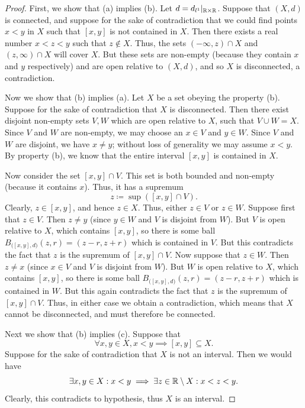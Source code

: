 \begin{proof}
  First, we show that (a) implies (b).
  Let \(d = d_{l^1}|_{\mathbb{R} \times \mathbb{R}}\).
  Suppose that \((X, d)\) is connected, and suppose for the sake of contradiction that we could find points \(x < y\) in \(X\) such that \([x, y]\) is not contained in \(X\).
  Then there exists a real number \(x < z < y\) such that \(z \notin X\).
  Thus, the sets \((-\infty, z) \cap X\) and \((z, \infty) \cap X\) will cover \(X\).
  But these sets are non-empty (because they contain \(x\) and \(y\) respectively) and are open relative to \((X, d)\), and so \(X\) is disconnected, a contradiction.

  Now we show that (b) implies (a).
  Let \(X\) be a set obeying the property (b).
  Suppose for the sake of contradiction that \(X\) is disconnected.
  Then there exist disjoint non-empty sets \(V , W\) which are open relative to \(X\), such that \(V \cup W = X\).
  Since \(V\) and \(W\) are non-empty, we may choose an \(x \in V\) and \(y \in W\).
  Since \(V\) and \(W\) are disjoint, we have \(x \neq y\);
  without loss of generality we may assume \(x < y\).
  By property (b), we know that the entire interval \([x, y]\) is contained in \(X\).

  Now consider the set \([x, y] \cap V\).
  This set is both bounded and non-empty (because it contains \(x\)).
  Thus, it has a supremum
  \[
    z \coloneqq \sup([x, y] \cap V).
  \]
  Clearly, \(z \in [x, y]\), and hence \(z \in X\).
  Thus, either \(z \in V\) or \(z \in W\).
  Suppose first that \(z \in V\).
  Then \(z \neq y\) (since \(y \in W\) and \(V\) is disjoint from \(W\)).
  But \(V\) is open relative to \(X\), which contains \([x, y]\), so there is some ball \(B_{\big([x,y], d\big)}(z, r) = (z - r, z + r)\) which is contained in \(V\).
  But this contradicts the fact that \(z\) is the supremum of \([x, y] \cap V\).
  Now suppose that \(z \in W\).
  Then \(z \neq x\) (since \(x \in V\) and \(V\) is disjoint from \(W\)).
  But \(W\) is open relative to \(X\), which contains \([x, y]\), so there is some ball \(B_{\big([x,y], d\big)}(z, r) = (z - r, z + r)\) which is contained in \(W\).
  But this again contradicts the fact that \(z\) is the supremum of \([x, y] \cap V\).
  Thus, in either case we obtain a contradiction, which means that \(X\) cannot be disconnected, and must therefore be connected.

  Next we show that (b) implies (c).
  Suppose that
  \[
    \forall x, y \in X, x < y \implies [x, y] \subseteq X.
  \]
  Suppose for the sake of contradiction that \(X\) is not an interval.
  Then we would have
  \[
    \exists x, y \in X : x < y \implies \exists z \in \mathbb{R} \setminus X : x < z < y.
  \]
  Clearly, this contradicts to hypothesis, thus \(X\) is an interval.


\end{proof}
